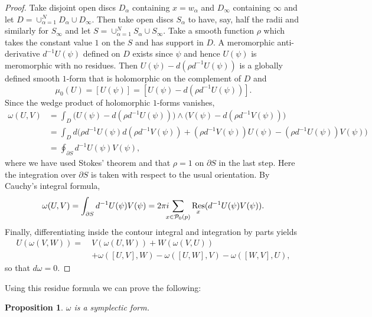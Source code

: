\documentclass[a4paper,12pt,reqno]{amsart}
\newcounter{counter2}
\numberwithin{equation}{section}
\numberwithin{counter2}{section}
\newcounter{counter3}
\newtheorem{prop}[counter2]{Proposition}
\begin{document}
\begin{proof} 
Take disjoint open discs $D_\alpha$ containing $x = w_\alpha$ and $D_\infty$ containing $\infty$  and let $D = \cup_{\alpha=1}^N D_\alpha \cup D_\infty$.  Then take open discs $S_{\alpha}$ to have, say,  half the radii and similarly for $S_\infty$ and let $S = \cup_{\alpha=1}^N S_\alpha \cup S_\infty$. 
Take a smooth function $\rho$ which takes the constant value $1$ on the $S$ and has support in $D$.  A meromorphic anti-derivative $d^{-1}U(\psi)$ defined on $D$ exists since $\psi$ and hence $U(\psi)$ is meromorphic with no residues.  
Then $U(\psi)- d(\rho d^{-1}U(\psi))$ is a globally defined smooth $1$-form that is holomorphic on the complement of $D$ and
\begin{equation}
\mu_0(U) = [U(\psi)] = [U(\psi)- d(\rho d^{-1}U(\psi))].  
\end{equation}
Since the wedge product of holomorphic $1$-forms vanishes,  
\begin{align}
\omega(U,V) &= \int_{D} \Big( U(\psi) - d(\rho d^{-1}U(\psi)) \Big) \wedge \Big( V(\psi) - d(\rho d^{-1}V(\psi)) \Big) \nonumber \\
 &= \int_{D} d\Big(\rho d^{-1}U(\psi) d(\rho d^{-1}V(\psi)) + (\rho d^{-1}V(\psi))  U(\psi) - (\rho d^{-1}U(\psi))  V(\psi) \Big) \nonumber \\ 
& = \oint_{\partial S} d^{-1}U(\psi)V(\psi),  
\end{align} 
where we have used Stokes' theorem and that $\rho = 1$ on $\partial S$ in the last step.  Here the integration over $\partial S$ is taken with respect to the usual orientation.  
By Cauchy's integral formula,  
\begin{align}
\omega(U,V) = \int_{\partial S} d^{-1}U(\psi)V(\psi)  = 2\pi i \hspace{-2mm} \sum_{x \in \mathcal{P}_0(p)}  \underset{x}{\operatorname{Res}}(d^{-1}U(\psi)  V(\psi)).  
\end{align} 
Finally,  differentiating inside the contour integral and integration by parts yields
\begin{align}
U(\omega(V,W)) = \  \nonumber &V(\omega(U,W)) + W(\omega(V,U)) \\ &+ \omega([U,V],W) - \omega([U,W],V) - \omega([W,V],U),  
\end{align}
so that $d\omega = 0$.  
\end{proof}
Using this residue formula we can prove the following: 
\begin{prop}
 $\omega$ is a symplectic form.  
\end{prop}
\end{document}
